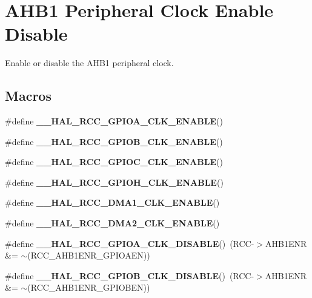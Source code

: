 \hypertarget{group___r_c_c___a_h_b1___clock___enable___disable}{}\section{A\+H\+B1 Peripheral Clock Enable Disable}
\label{group___r_c_c___a_h_b1___clock___enable___disable}


Enable or disable the A\+H\+B1 peripheral clock.  


\subsection*{Macros}
\begin{DoxyCompactItemize}
\item 
\#define {\bfseries \+\_\+\+\_\+\+H\+A\+L\+\_\+\+R\+C\+C\+\_\+\+G\+P\+I\+O\+A\+\_\+\+C\+L\+K\+\_\+\+E\+N\+A\+B\+LE}()
\item 
\#define {\bfseries \+\_\+\+\_\+\+H\+A\+L\+\_\+\+R\+C\+C\+\_\+\+G\+P\+I\+O\+B\+\_\+\+C\+L\+K\+\_\+\+E\+N\+A\+B\+LE}()
\item 
\#define {\bfseries \+\_\+\+\_\+\+H\+A\+L\+\_\+\+R\+C\+C\+\_\+\+G\+P\+I\+O\+C\+\_\+\+C\+L\+K\+\_\+\+E\+N\+A\+B\+LE}()
\item 
\#define {\bfseries \+\_\+\+\_\+\+H\+A\+L\+\_\+\+R\+C\+C\+\_\+\+G\+P\+I\+O\+H\+\_\+\+C\+L\+K\+\_\+\+E\+N\+A\+B\+LE}()
\item 
\#define {\bfseries \+\_\+\+\_\+\+H\+A\+L\+\_\+\+R\+C\+C\+\_\+\+D\+M\+A1\+\_\+\+C\+L\+K\+\_\+\+E\+N\+A\+B\+LE}()
\item 
\#define {\bfseries \+\_\+\+\_\+\+H\+A\+L\+\_\+\+R\+C\+C\+\_\+\+D\+M\+A2\+\_\+\+C\+L\+K\+\_\+\+E\+N\+A\+B\+LE}()
\item 
\mbox{\label{group___r_c_c___a_h_b1___clock___enable___disable_ga7083e491e6a1e165d064d199304bd2f0}} 
\#define {\bfseries \+\_\+\+\_\+\+H\+A\+L\+\_\+\+R\+C\+C\+\_\+\+G\+P\+I\+O\+A\+\_\+\+C\+L\+K\+\_\+\+D\+I\+S\+A\+B\+LE}()~(R\+CC-\/$>$A\+H\+B1\+E\+NR \&= $\sim$(R\+C\+C\+\_\+\+A\+H\+B1\+E\+N\+R\+\_\+\+G\+P\+I\+O\+A\+EN))
\item 
\mbox{\label{group___r_c_c___a_h_b1___clock___enable___disable_ga60be1be419b57dafbbb93df67d68a424}} 
\#define {\bfseries \+\_\+\+\_\+\+H\+A\+L\+\_\+\+R\+C\+C\+\_\+\+G\+P\+I\+O\+B\+\_\+\+C\+L\+K\+\_\+\+D\+I\+S\+A\+B\+LE}()~(R\+CC-\/$>$A\+H\+B1\+E\+NR \&= $\sim$(R\+C\+C\+\_\+\+A\+H\+B1\+E\+N\+R\+\_\+\+G\+P\+I\+O\+B\+EN))

\end{DoxyCompactItemize}
